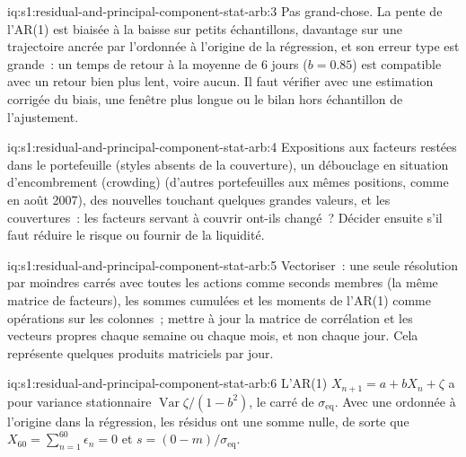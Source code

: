 \begin{solution}{iq:s1:residual-and-principal-component-stat-arb:3}
Pas grand-chose. La pente de l'AR(1) est biaisée à la baisse sur petits échantillons, davantage sur une trajectoire ancrée par l'ordonnée à l'origine de la régression, et son erreur type est grande~: un
temps de retour à la moyenne de 6 jours ($b = 0.85$) est compatible avec un retour bien plus lent, voire aucun. Il faut vérifier avec une estimation corrigée du biais, une fenêtre plus longue ou le
bilan hors échantillon de l'ajustement.
\end{solution}

\begin{solution}{iq:s1:residual-and-principal-component-stat-arb:4}
Expositions aux facteurs restées dans le portefeuille (styles absents de la couverture), un débouclage en situation d'encombrement (crowding) (d'autres portefeuilles aux mêmes positions, comme en août 2007), des nouvelles touchant quelques grandes
valeurs, et les couvertures~: les facteurs servant à couvrir ont-ils changé~? Décider ensuite s'il faut réduire le risque ou fournir de la liquidité.
\end{solution}

\begin{solution}{iq:s1:residual-and-principal-component-stat-arb:5}
Vectoriser~: une seule résolution par moindres carrés avec toutes les actions comme seconds membres (la même matrice de facteurs), les sommes cumulées et les moments de l'AR(1) comme opérations sur les colonnes~;
mettre à jour la matrice de corrélation et les vecteurs propres chaque semaine ou chaque mois, et non chaque jour. Cela représente quelques produits matriciels par jour.
\end{solution}

\begin{solution}{iq:s1:residual-and-principal-component-stat-arb:6}
L'AR(1) $X_{n+1} = a + bX_n + \zeta$ a pour variance stationnaire $\operatorname{Var}\zeta/(1 - b^2)$, le carré de $\sigma_{\mathrm{eq}}$. Avec une ordonnée à l'origine dans
la régression, les résidus ont une somme nulle, de sorte que $X_{60} = \sum_{n=1}^{60} \epsilon_n = 0$ et $s = (0 - m)/\sigma_{\mathrm{eq}}$.
\end{solution}
